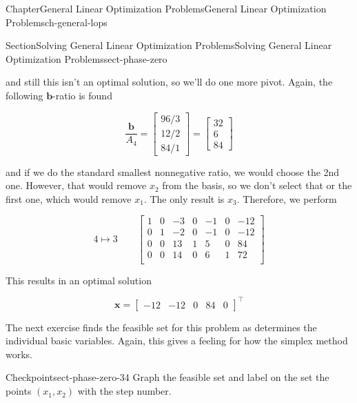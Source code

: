 \documentclass[oneside,10pt,]{book}
\numberwithin{equation}{section}
\newcommand{\amp}{&}
\begin{document}
\begin{chapterptx}{Chapter}{General Linear Optimization Problems}{}{General Linear Optimization Problems}{}{}{ch-general-lops}
\begin{sectionptx}{Section}{Solving General Linear Optimization Problems}{}{Solving General Linear Optimization Problems}{}{}{sect-phase-zero}
\begin{equation*}
\end{equation*}
%
\par
and still this isn't an optimal solution, so we'll do one more pivot. Again, the following \(\boldsymbol{b}\)-ratio is found%
\par
%
\begin{equation*}
\frac{\boldsymbol{b}}{A_4} = \begin{bmatrix}96/3 \\ 12/2 \\ 84/1 \end{bmatrix} = \begin{bmatrix} 32 \\ 6 \\ 84 \end{bmatrix}
\end{equation*}
%
\par
and if we do the standard smallest nonnegative ratio, we would choose the 2nd one. However, that would remove \(x_2\) from the basis, so we don't select that or the first one, which would remove \(x_1\). The only result is \(x_3\). Therefore, we perform%
\par
%
\begin{equation*}
4 \mapsto 3 \qquad \left[\begin{array}{rr|rrrr|r} 1 \amp 0 \amp -3 \amp 0 \amp -1 \amp 0 \amp -12\\ 0 \amp 1 \amp -2 \amp 0 \amp -1 \amp 0 \amp -12\\ 0 \amp 0 \amp 13 \amp 1 \amp 5 \amp 0 \amp 84\\ \hline 0 \amp 0 \amp 14 \amp 0 \amp 6 \amp 1 \amp 72\\ \end{array} \right]
\end{equation*}
%
\par
This results in an optimal solution%
\par
%
\begin{equation*}
\boldsymbol{x} = \left[\begin{array}{rr|rrr} -12 \amp -12 \amp 0 \amp 84 \amp 0 \end{array}\right]^{\intercal}
\end{equation*}
%
\par
The next exercise finds the feasible set for this problem as determines the individual basic variables. Again, this gives a feeling for how the simplex method works.%
\begin{inlineexercise}{Checkpoint}{}{sect-phase-zero-34}%
Graph the feasible set and label on the set the points \((x_1, x_2)\) with the step number.%

\end{inlineexercise}
\end{sectionptx}
\end{chapterptx}
\end{document}
